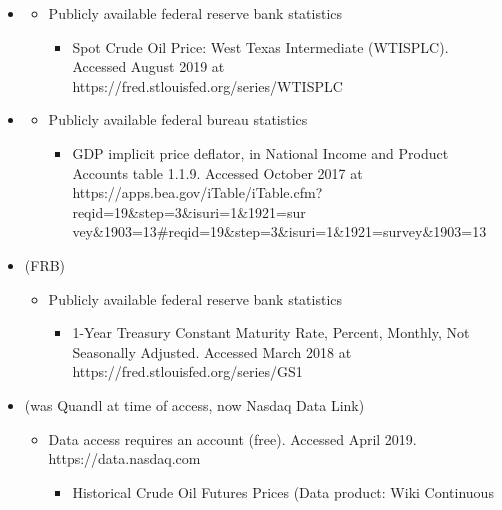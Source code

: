 \documentclass[12pt,english]{article}
\begin{document}
	\begin{itemize}
		\item \citet{fredwti} %
		\begin{itemize}
			\item Publicly available federal reserve bank statistics
			\begin{itemize}
				\item Spot Crude Oil Price: West Texas Intermediate (WTISPLC). Accessed August 2019 at\\
				https://fred.stlouisfed.org/series/WTISPLC 
			\end{itemize}
		\end{itemize}		
		\item \citet{bea} %
		\begin{itemize}
			\item Publicly available federal bureau statistics
			\begin{itemize}
				\item GDP implicit price deflator, in National Income and Product Accounts
				table 1.1.9. Accessed October 2017 at\\
				https://apps.bea.gov/iTable/iTable.cfm?reqid=19\&step=3\&isuri=1\&1921=sur vey\&1903=13\#reqid=19\&step=3\&isuri=1\&1921=survey\&1903=13
			\end{itemize}
		\end{itemize}
		\item \citet{fredgs1} (FRB) %
		\begin{itemize}
			\item Publicly available federal reserve bank statistics
			\begin{itemize}
				\item 1-Year Treasury Constant Maturity Rate, Percent, Monthly, Not Seasonally
				Adjusted. Accessed March 2018 at\\
				https://fred.stlouisfed.org/series/GS1
			\end{itemize}
		\end{itemize}	
		\item \citet{quandl} (was Quandl at time of access, now Nasdaq Data Link)
		\begin{itemize}
			\item Data access requires an account (free). Accessed April 2019.\\
			https://data.nasdaq.com
			\begin{itemize}
				\item Historical Crude Oil Futures Prices (Data product: Wiki Continuous

\end{itemize}
\end{itemize}
\end{itemize}
\end{document}
